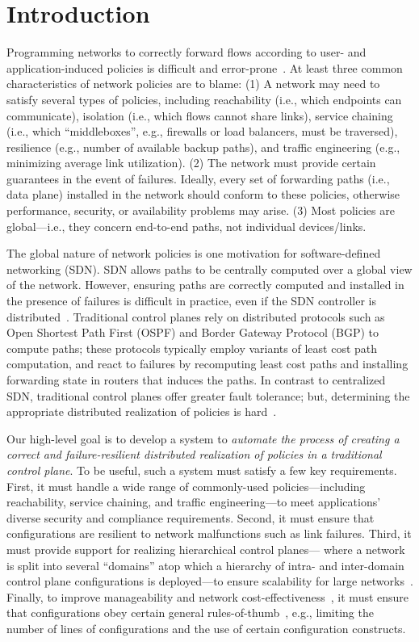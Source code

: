\section{Introduction}
Programming networks to correctly forward flows according to user- and
application-induced policies is difficult and
error-prone~\cite{troubleshooting, bgpmisconfig}. 
At least three
common characteristics of network policies are to blame: (1) A network
may need to satisfy several types of policies, including reachability
(i.e., which endpoints can communicate), isolation (i.e., which flows
cannot share links), service chaining (i.e., which ``middleboxes'',
e.g., firewalls or load balancers, must be traversed), resilience
(e.g., number of available backup paths), and traffic engineering
(e.g., minimizing average link utilization). (2) The network must
provide certain guarantees in the event of failures. Ideally, every
set of forwarding paths (i.e., data plane) installed in the network
should conform to these policies, otherwise performance, security, or
availability problems may arise. (3) Most policies are global---i.e.,
they concern end-to-end paths, not individual devices/links.

The global nature of network policies is one motivation for
software-defined networking (SDN). SDN allows paths to be centrally
computed over a global view of the network. However, ensuring paths
are correctly computed and installed in the presence of failures is
difficult in practice, even if the SDN controller is
distributed~\cite{hasdn}.  Traditional control planes rely on
distributed protocols such as Open Shortest Path First (OSPF) and
Border Gateway Protocol (BGP) to compute paths; these protocols
typically employ variants of least cost path computation, and react to
failures by recomputing least cost paths and installing forwarding
state in routers that induces the paths. In contrast to centralized
SDN, traditional control planes offer greater fault tolerance; but,
determining the appropriate distributed realization of policies is
hard~\cite{propane}.

Our high-level goal is to develop a system to {\em automate the
  process of creating a correct and failure-resilient distributed
  realization of policies in a traditional control plane}. To be
useful, such a system must satisfy a few key requirements. First, it
must handle a wide range of commonly-used policies---including
reachability, service chaining, and traffic engineering---to meet
applications' diverse security and compliance requirements. Second, it
must ensure that configurations are resilient to network malfunctions
such as link failures. Third, it
must provide support for realizing hierarchical control planes---
where a network is split into several ``domains'' atop which a
hierarchy of intra- and inter-domain control plane configurations 
is deployed---to ensure
scalability for large networks~\cite{routingdesign}. 
Finally, to improve manageability and network
cost-effectiveness~\cite{mpa-imc15,complexity:sigcomm11}, it must
ensure that configurations obey certain general
rules-of-thumb~\cite{complexity:nsdi09}, e.g., limiting the number of
lines of configurations and the use of certain configuration
constructs.


